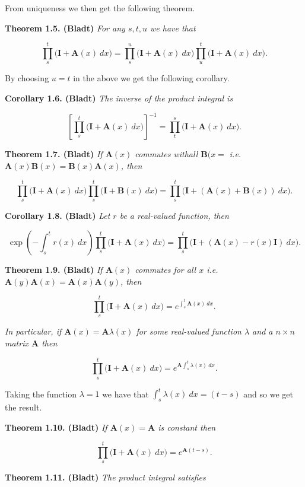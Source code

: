 \documentclass[
]{book}
\begin{document}
From uniqueness we then get the following theorem.

\textbf{Theorem 1.5. (Bladt)} \emph{For any \(s,t,u\) we have that}

\[
\prod_{s}^t\big(\mathbf{I}+\mathbf{A}(x)\ dx\big)=\prod_{s}^u\big(\mathbf{I}+\mathbf{A}(x)\ dx\big)\prod_{u}^t\big(\mathbf{I}+\mathbf{A}(x)\ dx\big).
\]

By choosing \(u=t\) in the above we get the following corollary.

\textbf{Corollary 1.6. (Bladt)} \emph{The inverse of the product integral is}

\[
\left[\prod_{s}^t\big(\mathbf{I}+\mathbf{A}(x)\ dx\big)\right]^{-1}=\prod_{t}^s\big(\mathbf{I}+\mathbf{A}(x)\ dx\big).
\]

\textbf{Theorem 1.7. (Bladt)} \emph{If \(\mathbf{A}(x)\) commutes withall \(\mathbf{B}(x=\) i.e.~\(\mathbf{A}(x)\mathbf{B}(x)=\mathbf{B}(x)\mathbf{A}(x)\), then}

\[
\prod_{s}^t\big(\mathbf{I}+\mathbf{A}(x)\ dx\big)\prod_{s}^t\big(\mathbf{I}+\mathbf{B}(x)\ dx\big)=\prod_{s}^t\big(\mathbf{I}+\left(\mathbf{A}(x)+\mathbf{B}(x)\right)\ dx\big).
\]

\textbf{Corollary 1.8. (Bladt)} \emph{Let \(r\) be a real-valued function, then}

\[
\exp\left(-\int_s^t r(x)\ dx\right)\prod_{s}^t\big(\mathbf{I}+\mathbf{A}(x)\ dx\big)=\prod_{s}^t\big(\mathbf{I}+\left(\mathbf{A}(x)-r(x)\mathbf{I}\right)\ dx\big).
\]

\textbf{Theorem 1.9. (Bladt)} \emph{If \(\mathbf{A}(x)\) commutes for all \(x\) i.e.~\(\mathbf{A}(y)\mathbf{A}(x)=\mathbf{A}(x)\mathbf{A}(y)\), then}

\[
\prod_{s}^t\big(\mathbf{I}+\mathbf{A}(x)\ dx\big)=e^{\int_s^t\mathbf{A}(x)\ dx}.
\]

\emph{In particular, if \(\mathbf{A}(x)=\mathbf{A}\lambda(x)\) for some real-valued function \(\lambda\) and a \(n\times n\) matrix \(\mathbf{A}\) then}

\[
\prod_{s}^t\big(\mathbf{I}+\mathbf{A}(x)\ dx\big)=e^{\mathbf{A}\int_s^t\lambda(x)\ dx}.
\]

Taking the function \(\lambda=1\) we have that \(\int_s^t\lambda(x)\ dx=(t-s)\) and so we get the result.

\textbf{Theorem 1.10. (Bladt)} \emph{If \(\mathbf{A}(x)=\mathbf{A}\) is constant then}

\[
\prod_{s}^t\big(\mathbf{I}+\mathbf{A}(x)\ dx\big)=e^{\mathbf{A}(t-s)}.
\]

\textbf{Theorem 1.11. (Bladt)} \emph{The product integral satisfies}
\end{document}
